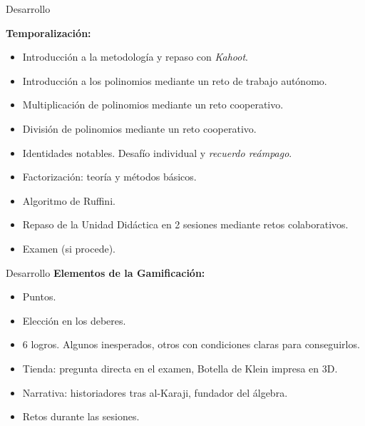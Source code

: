 \documentclass[10pt,notes,compress,usetitleprogressbar,aspectratio=1610]{beamer}
\begin{document}
\begin{frame}{Desarrollo}

\textbf{Temporalización:}
\begin{itemize}
	\item Introducción a la metodología y repaso con \textit{Kahoot}.
	\item Introducción a los polinomios mediante un reto de trabajo autónomo.
	\item Multiplicación de polinomios mediante un reto cooperativo.
	\item División de polinomios mediante un reto cooperativo.
	\item Identidades notables. Desafío individual y \textit{recuerdo re\'ampago}.
	\item Factorización: teoría y métodos básicos.
	\item Algoritmo de Ruffini.
	\item Repaso de la Unidad Didáctica en 2 sesiones mediante retos colaborativos.
	\item Examen (si procede).
\end{itemize}
\end{frame}


\begin{frame}{Desarrollo}
\textbf{Elementos de la Gamificación:}
\begin{itemize}
	\item Puntos.
	\item Elección en los deberes.
	\item 6 logros. Algunos inesperados, otros con condiciones claras para conseguirlos.
	\item Tienda: pregunta directa en el examen, Botella de Klein impresa en 3D.
	\item Narrativa: historiadores tras al-Karaji, fundador del álgebra.
	\item Retos durante las sesiones.
\end{itemize}

\end{frame}
\end{document}
